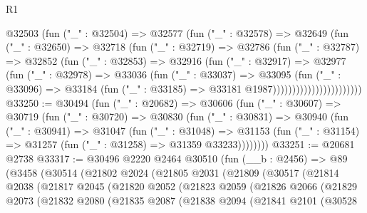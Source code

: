 \begin{lexlean}{R1}
\begin{coremodule}
                          @32503
                            (fun ("_" : @32504) =>
                            @32577
                              (fun ("_" : @32578) =>
                              @32649
                                (fun ("_" : @32650) =>
                                @32718
                                  (fun ("_" : @32719) =>
                                  @32786
                                    (fun ("_" : @32787) =>
                                    @32852
                                      (fun ("_" : @32853) =>
                                      @32916
                                        (fun ("_" : @32917) =>
                                        @32977
                                          (fun ("_" : @32978) =>
                                          @33036
                                            (fun ("_" : @33037) =>
                                            @33095
                                              (fun ("_" : @33096) =>
                                              @33184
                                                (fun ("_" : @33185) =>
                                                @33181 @1987)))))))))))))))))))))))
@33250 := @30494
    (fun ("_" : @20682) =>
    @30606
      (fun ("_" : @30607) =>
      @30719
        (fun ("_" : @30720) =>
        @30830
          (fun ("_" : @30831) =>
          @30940
            (fun ("_" : @30941) =>
            @31047
              (fun ("_" : @31048) =>
              @31153 (fun ("_" : @31154) => @31257 (fun ("_" : @31258) => @31359 @33233))))))))
@33251 := @20681 @2738
@33317 := @30496
    @2220
    @2464
    @30510
    (fun (__b : @2456) =>
    @89
      (@3458
        (@30514
          (@21802
            @2024
            (@21805
              @2031
              (@21809
                (@30517
                  (@21814
                    @2038
                    (@21817
                      @2045
                      (@21820
                        @2052
                        (@21823
                          @2059
                          (@21826
                            @2066
                            (@21829
                              @2073
                              (@21832
                                @2080
                                (@21835
                                  @2087
                                  (@21838
                                    @2094
                                    (@21841
                                      @2101
                                      (@30528

\end{coremodule}
\end{lexlean}
